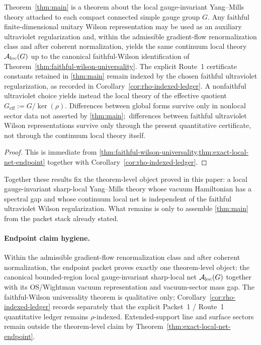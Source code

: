 \begin{corollary}\label{cor:group-only-endpoint}
Theorem~\ref{thm:main} is a theorem about the local gauge-invariant Yang--Mills theory attached to each compact connected simple gauge group $G$. Any faithful finite-dimensional unitary Wilson representation may be used as an auxiliary ultraviolet regularization and, within the admissible gradient-flow renormalization class and after coherent normalization, yields the same continuum local theory $\mathcal{A}_{\mathrm{loc}}(G)$ up to the canonical faithful-Wilson identification of Theorem~\ref{thm:faithful-wilson-universality}. The explicit Route~1 certificate constants retained in \cref{thm:main} remain indexed by the chosen faithful ultraviolet regularization, as recorded in Corollary~\ref{cor:rho-indexed-ledger}. A nonfaithful ultraviolet choice yields instead the local theory of the effective quotient $G_{\mathrm{eff}}:=G/\ker(\rho)$. Differences between global forms survive only in nonlocal sector data not asserted by \cref{thm:main}$;$ differences between faithful ultraviolet Wilson representations survive only through the present quantitative certificate, not through the continuum local theory itself.
\end{corollary}

\begin{proof}
This is immediate from \cref{thm:faithful-wilson-universality,thm:exact-local-net-endpoint} together with Corollary~\ref{cor:rho-indexed-ledger}.
\end{proof}

Together these results fix the theorem-level object proved in this paper: a local gauge-invariant sharp-local Yang--Mills theory whose vacuum Hamiltonian has a spectral gap and whose continuum local net is independent of the faithful ultraviolet Wilson regularization. What remains is only to assemble \cref{thm:main} from the packet stack already stated.

\paragraph{Endpoint claim hygiene.}
Within the admissible gradient-flow renormalization class and after coherent normalization, the endpoint packet proves exactly one theorem-level object: the canonical bounded-region local gauge-invariant sharp-local net $\mathcal{A}_{\mathrm{loc}}(G)$ together with its OS/Wightman vacuum representation and vacuum-sector mass gap. The faithful-Wilson universality theorem is qualitative only; Corollary~\ref{cor:rho-indexed-ledger} records separately that the explicit Packet~1 / Route~1 quantitative ledger remains $\rho$-indexed. Extended-support line and surface sectors remain outside the theorem-level claim by Theorem~\ref{thm:exact-local-net-endpoint}.

